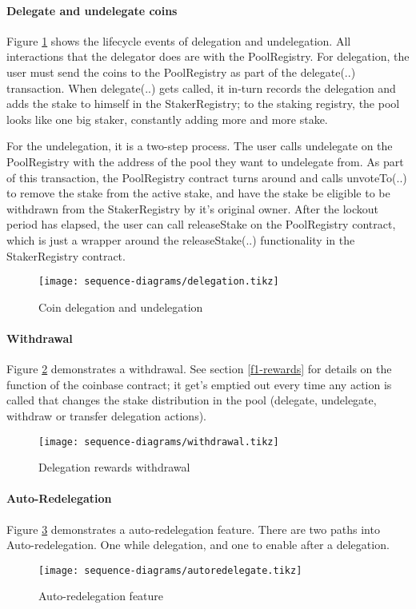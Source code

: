 \paragraph{Delegate and undelegate coins}

Figure \ref{fig:delegation} shows the lifecycle events of delegation and undelegation. All interactions that the delegator does are with the PoolRegistry. For delegation, the user must send the coins to the PoolRegistry as part of the delegate(..) transaction. When delegate(..) gets called, it in-turn records the delegation and adds the stake to himself in the StakerRegistry; to the staking registry, the pool looks like one big staker, constantly adding more and more stake. 

For the undelegation, it is a two-step process. The user calls undelegate on the PoolRegistry with the address of the pool they want to undelegate from. As part of this transaction, the PoolRegistry contract turns around and calls unvoteTo(..) to remove the stake from the active stake, and have the stake be eligible to be withdrawn from the StakerRegistry by it's original owner. After the lockout period has elapsed, the user can call releaseStake on the PoolRegistry contract, which is just a wrapper around the releaseStake(..) functionality in the StakerRegistry contract. 

\begin{figure}[ht]
\centering
\texttt{[image: sequence-diagrams/delegation.tikz]}
\caption{Coin delegation and undelegation}
\label{fig:delegation}
\end{figure}

\paragraph{Withdrawal}

Figure \ref{fig:withdrawal} demonstrates a withdrawal. See section \ref{f1-rewards} for details on the function of the coinbase contract; it get's emptied out every time any action is called that changes the stake distribution in the pool (delegate, undelegate, withdraw or transfer delegation actions).  

\begin{figure}[ht]
\centering
\texttt{[image: sequence-diagrams/withdrawal.tikz]}
\caption{Delegation rewards withdrawal}
\label{fig:withdrawal}
\end{figure}


\paragraph{Auto-Redelegation}

Figure \ref{fig:redelegation} demonstrates a auto-redelegation feature. There are two paths into Auto-redelegation. One while delegation, and one to enable after a delegation.  

\begin{figure}[ht]
\centering
\texttt{[image: sequence-diagrams/autoredelegate.tikz]}
\caption{Auto-redelegation feature}
\label{fig:redelegation}
\end{figure}

